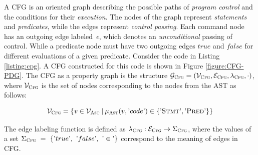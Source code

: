 A CFG \cite{CPG-yamaguchi2014modeling} is an oriented graph describing the possible paths of \textit{program control} and the conditions for their \textit{execution}. The nodes of the graph represent \textit{statements} and \textit{predicates}, while the edges represent \textit{control passing}. Each command node has an outgoing edge labeled~$\epsilon$, which denotes an \textit{unconditional} passing of control. While a predicate node must have two outgoing edges $true$ and $false$ for different evaluations of a given predicate. Consider the code in Listing \ref{listing:cpg}. A CFG constructed for this code is shown in Figure \ref{figure:CFG-PDG}. The CFG as a property graph is the structure $\mathcal{G}_{\textsc{Cfg}} = ( \mathcal{V}_{\textsc{Cfg}}, \mathcal{E}_{\textsc{Cfg}}, \lambda_{\textsc{Cfg}}, \cdot )$, where $\mathcal{V}_{\textsc{Cfg}}$ is the set of nodes corresponding to the nodes from the AST as follows:

\begin{equation*}
\mathcal{V}_{\textsc{Cfg}} = \{\mathit{v} \in \mathcal{V}_{\textsc{Ast}} \: | \: \mu_{\textsc{Ast}}(v, \textrm'code\textrm') \in \{\textrm'\textsc{Stmt}\textrm', \textrm'\textsc{Pred}\textrm'\} \}
\end{equation*}

The edge labeling function is defined as $\lambda_{\textsc{Cfg}} : \mathcal{E}_{\textsc{Cfg}} \rightarrow \Sigma_{\textsc{Cfg}}$, where the values of a set $\Sigma_{\textsc{Cfg}}~=~\{\textrm'true\textrm',~\textrm'false\textrm',~\textrm'\in\textrm'\}$ correspond to the meaning of edges in CFG.

